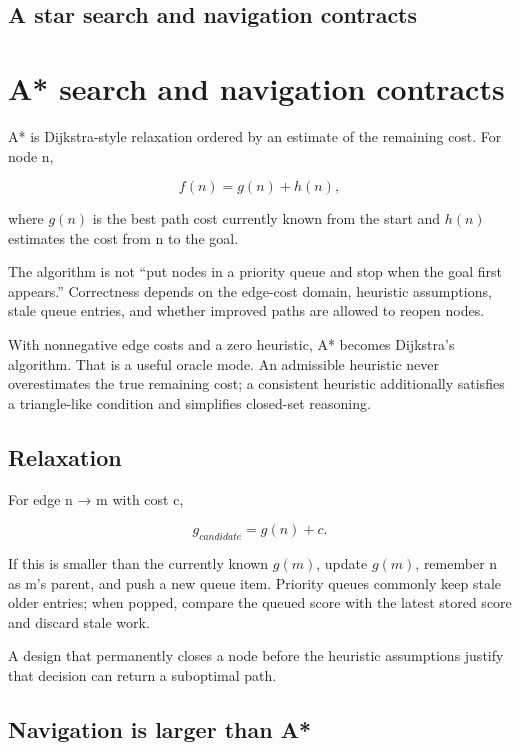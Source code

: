 \hypertarget{appendix-5803241aa1a5}{}
\section*{A star search and navigation contracts}
\chapter{A* search and navigation contracts}\label{appendix-5803241aa1a5-a-search-and-navigation-contracts}

A* is Dijkstra-style relaxation ordered by an estimate of the remaining cost. For node n,

\[
f(n)=g(n)+h(n),
\]

where \(g(n)\) is the best path cost currently known from the start and \(h(n)\) estimates the cost from n to the goal.

The algorithm is not ``put nodes in a priority queue and stop when the goal first appears.'' Correctness depends on the edge-cost domain, heuristic assumptions, stale queue entries, and whether improved paths are allowed to reopen nodes.

With nonnegative edge costs and a zero heuristic, A* becomes Dijkstra's algorithm. That is a useful oracle mode. An admissible heuristic never overestimates the true remaining cost; a consistent heuristic additionally satisfies a triangle-like condition and simplifies closed-set reasoning.

\section{Relaxation}\label{appendix-5803241aa1a5-relaxation}

For edge n → m with cost c,

\[
g_{candidate}=g(n)+c.
\]

If this is smaller than the currently known \(g(m)\), update \(g(m)\), remember n as m's parent, and push a new queue item. Priority queues commonly keep stale older entries; when popped, compare the queued score with the latest stored score and discard stale work.

A design that permanently closes a node before the heuristic assumptions justify that decision can return a suboptimal path.

\section{Navigation is larger than A*}\label{appendix-5803241aa1a5-navigation-is-larger-than-a}


